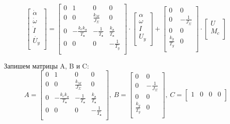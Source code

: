 \documentclass[a4paper, 11pt]{article}
\begin{document}
\begin{equation}
	\begin{bmatrix}
		\dot{\alpha}\\
		\dot{\omega}\\
		\dot{I}\\
		\dot{U_y}\\
	\end{bmatrix}
	=
	\begin{bmatrix}
		\displaystyle 0 & 1 & 0 & 0 \\
		\displaystyle 0 & 0 & \displaystyle\frac{k_M}{J_\Sigma} & 0 \\
		\displaystyle 0 & \displaystyle -\frac{k_ek_\text{д}}{T_\text{я}} & \displaystyle -\frac{1}{T_\text{я}} & \displaystyle \frac{k_\text{д}}{T_\text{я}} \\
		\displaystyle 0 & 0 & 0 & \displaystyle -\frac{1}{T_y}\\
	\end{bmatrix}
	\cdot 
	\begin{bmatrix}
		{\alpha}\\
		{\omega}\\
		{I}\\
		{U_y}\\
	\end{bmatrix}
	+
	\begin{bmatrix}
		0 & 0 \\
		\displaystyle 0 & \displaystyle -\frac{1}{J_\Sigma} \\
		0 & 0 \\
		\displaystyle \frac{k_y}{T_y} & 0 \\
	\end{bmatrix}
	\cdot
	\begin{bmatrix}
		U\\
		M_c\\
	\end{bmatrix}
\end{equation}
\par 
Запишем матрицы A, B и C:
\begin{equation}
	A = 
	\begin{bmatrix}
		\displaystyle 0 & 1 & 0 & 0\\
		\displaystyle 0 & 0 & \frac{k_M}{J_\Sigma} & 0\\
		\displaystyle 0 & \displaystyle -\frac{k_ek_\text{д}}{T_\text{я}} & \displaystyle -\frac{1}{T_\text{я}} & \displaystyle \frac{k_\text{д}}{T_\text{я}}\\
		\displaystyle 0 & 0 & 0 & \displaystyle -\frac{1}{T_\text{я}}\\
	\end{bmatrix}
	,\ B = 
	\begin{bmatrix}
		0 & 0\\
		\displaystyle 0 & \displaystyle -\frac{1}{J_\Sigma}\\
		0 & 0\\
		\displaystyle \frac{k_y}{T_y} & 0\\
	\end{bmatrix}
	, \ C = 
	\begin{bmatrix}
		1 & 0 & 0 & 0\\
	\end{bmatrix}
\end{equation}
\end{document}
